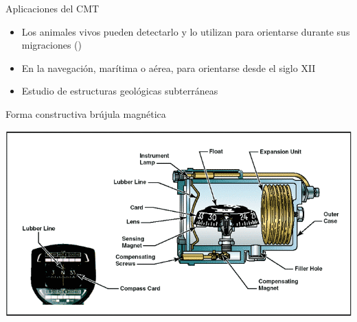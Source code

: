   


\begin{frame}
  
  \begin{block}{Aplicaciones del CMT }
    \begin{itemize}
    \item Los animales vivos pueden detectarlo y lo utilizan para orientarse durante sus migraciones ()
    \item En la navegaci\'on, mar\'itima o a\'erea, para orientarse desde el siglo XII
    \item Estudio de estructuras geol\'ogicas subterr\'aneas
    \end{itemize}
  \end{block}


\end{frame}

\begin{frame}{Forma constructiva  br\'ujula magn\'etica}

    \begin{center}
\includegraphics[width=\textwidth]{05.instrumentos.giroscopicos.imagenes/05.04.MagnetismoTerrestre/05-04-brujula_magnetica_construccion.png}
\end{center}

\end{frame}

